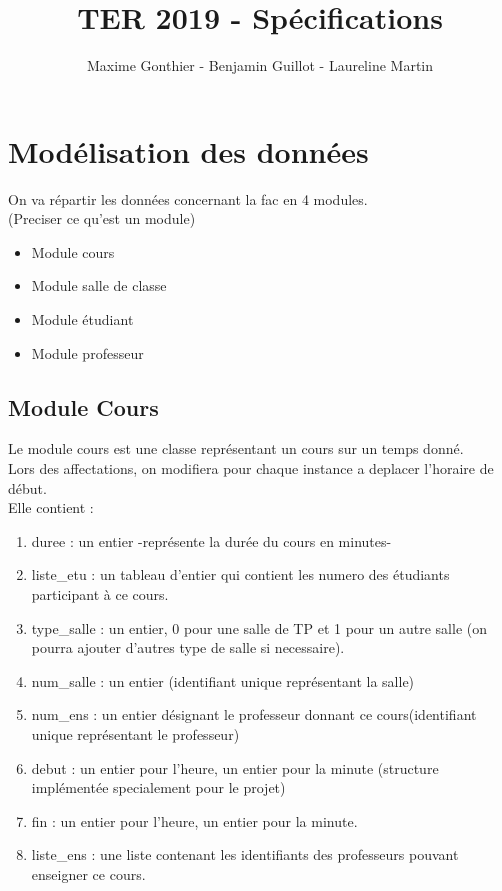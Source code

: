 \documentclass[a4paper,11pt]{article}
\title{TER 2019 - Spécifications}
\author{Maxime Gonthier - Benjamin Guillot - Laureline Martin}
\begin{document}
	\clearpage
	\maketitle

\newpage
\tableofcontents

\newpage
\section{Modélisation des données}
	On va répartir les données concernant la fac en 4 modules.\\
	(Preciser ce qu'est un module)
	\begin{itemize}
		\item Module cours
		\item Module salle de classe
		\item Module étudiant
		\item Module professeur
	\end{itemize}
	\subsection{Module Cours}
		Le module cours est une classe représentant un cours sur un temps donné.\\
		Lors des affectations, on modifiera pour chaque instance a deplacer l'horaire de début.\\
		Elle contient : 
		\begin{enumerate}
			\item duree : un entier -représente la durée du cours en minutes-
			\item liste_etu : un tableau d'entier qui contient les numero des étudiants participant à ce cours.
			\item type_salle : un entier, 0 pour une salle de TP et 1 pour un autre salle (on pourra ajouter d'autres type de salle si necessaire).
			\item num_salle : un entier (identifiant unique représentant la salle)
			\item num_ens : un entier désignant le professeur donnant ce cours(identifiant unique représentant le professeur)
			\item debut : un entier pour l'heure, un entier pour la minute (structure implémentée specialement pour le projet)  
			\item fin : un entier pour l'heure, un entier pour la minute.
			\item liste_ens : une liste contenant les identifiants des professeurs pouvant enseigner ce cours.
		\end{enumerate}
\end{document}
